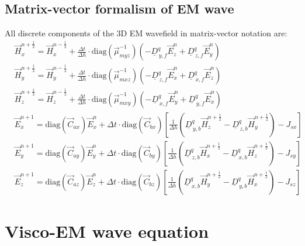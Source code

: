 \documentclass[pdftex,a4paper,parskip,listof=totoc,bibliography=totoc,onehalfspacing,12pt]{scrreprt}
\begin{document}
\section{Matrix-vector formalism of EM wave}
All discrete components of the 3D EM wavefield in matrix-vector notation are: 
\begin{equation}
\begin{align*}
  &\vec{H}_{x}^{n+\frac{1}{2}} = \vec{H}_{x}^{n-\frac{1}{2}} + \frac{\Delta t}{\Delta h} \cdot  \mathrm{diag} \left(\vec{\mu}_{myz}^{-1}\right)  \left(- \underline{D}_{\,y,f}^q \vec{E}_{z}^{n} + \underline{D}_{\,z,f}^q \vec{E}_{y}^{n} \right)\\
  &\vec{H}_{y}^{n+\frac{1}{2}} = \vec{H}_{y}^{n-\frac{1}{2}} + \frac{\Delta t}{\Delta h} \cdot  \mathrm{diag} \left(\vec{\mu}_{mxz}^{-1}\right)  \left(- \underline{D}_{\,z,f}^q \vec{E}_{x}^{n} + \underline{D}_{\,x,f}^q \vec{E}_z^{n} \right)\\
  &\vec{H}_{z}^{n+\frac{1}{2}} = \vec{H}_{z}^{n-\frac{1}{2}} + \frac{\Delta t}{\Delta h} \cdot  \mathrm{diag} \left(\vec{\mu}_{mxy}^{-1}\right)  \left(- \underline{D}_{\,x,f}^q \vec{E}_y^{n} + \underline{D}_{\,y,f}^q \vec{E}_x^{n} \right)\\
  &\vec{E}_{x}^{n+1} =  \mathrm{diag} \left(\vec{C}_{ax}\right) \vec{E}_{x}^{n} + \Delta t \cdot  \mathrm{diag} \left(\vec{C}_{bx}\right) \left[ \frac{1}{\Delta h} \left( \underline{D}_{\,y,b}^q \vec{H}_z^{n+\frac{1}{2}} - \underline{D}_{\,z,b}^q \vec{H}_y^{n+\frac{1}{2}} \right) - J_{sx} \right]\\
  &\vec{E}_{y}^{n+1} =  \mathrm{diag} \left(\vec{C}_{ay}\right) \vec{E}_{y}^{n} + \Delta t \cdot  \mathrm{diag} \left(\vec{C}_{by}\right) \left[ \frac{1}{\Delta h} \left( \underline{D}_{\,z,b}^q  \vec{H}_x^{n+\frac{1}{2}} - \underline{D}_{\,x,b}^q \vec{H}_z^{n+\frac{1}{2}} \right) - J_{sy} \right]\\
  &\vec{E}_{z}^{n+1} =  \mathrm{diag} \left(\vec{C}_{az}\right) \vec{E}_{z}^{n} + \Delta t \cdot  \mathrm{diag} \left(\vec{C}_{bz}\right) \left[ \frac{1}{\Delta h} \left( \underline{D}_{\,x,b}^q \vec{H}_y^{n+\frac{1}{2}} - \underline{D}_{\,y,b}^q \vec{H}_x^{n+\frac{1}{2}} \right) - J_{sz} \right]
\end{align*}
\end{equation}

\chapter{Visco-EM wave equation}
\label{sec:Visco_EM_wave_equation}
\end{document}
